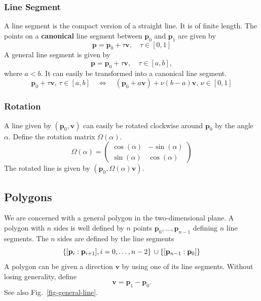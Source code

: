 \documentclass[11pt]{article}
\newcommand{\pb}{\mathbf{p}}
\newcommand{\vb}{\mathbf{v}}
\newcommand{\figref}[1]{Fig.~\eqref{#1}}
\begin{document}
\subsubsection{Line Segment}
\label{sec-line-segment}
A line segment is the compact version of a straight line. It is of finite
length. The points on a {\bf canonical} line segment between $\pb_0$ and
$\pb_1$ are given by
\begin{equation}
    \pb=\pb_0 + \tau \vb,\quad \tau\in[0,1] \label{eq-line-canonical}
\end{equation}
A general line segment is given by
\begin{equation}
    \pb=\pb_0 + \tau \vb,\quad \tau\in[a,b], \label{eq-line-ab}
\end{equation}
where $a<b$. It can easily be transformed into a canonical line segment.
\begin{equation}
    \pb_0+\tau \vb,\,\tau\in [a,b]\quad\Leftrightarrow\quad
    (\pb_0+a\vb) +\nu(b-a) \vb,\,\nu\in [0,1]
\end{equation}


\subsubsection{Rotation}
\label{sec-rotation-line}

A line given by $(\pb_0, \vb)$ can easily be rotated clockwise around
$\pb_0$ by the angle $\alpha$. Define the rotation matrix $\Omega(\alpha)$.
\begin{equation}
    \Omega(\alpha)=\left(
    \begin{matrix}
        \cos(\alpha) & -\sin(\alpha) \\
        \sin(\alpha) & \cos(\alpha)
    \end{matrix}
    \right)\label{eq-rotation-matrix-Omega}
\end{equation}
The rotated line is given by $(\pb_0, \Omega(\alpha)\vb)$.

\subsection{Polygons}
\label{sec-polygons}

We are concerned with a general polygon in the two-dimensional plane. A polygon
with $n$ sides is well defined by $n$ points $\pb_0,\ldots,\pb_{n-1}$
defining $n$ line segments. The $n$ sides are defined by the line segments
\begin{equation}
    \left\{[\pb_i:\pb_{i+1}], i=0,\ldots,n-2\right\}\\
\cup\left\{[\pb_{n-1}:\pb_{0}]\right\}
\end{equation}
A polygon can be given a direction $\vb$  by using one of its line segments.
Without losing generality, define
\begin{equation*}
    \vb=\pb_1-\pb_0.
\end{equation*}
See also \figref{fig-general-line}.
\end{document}
